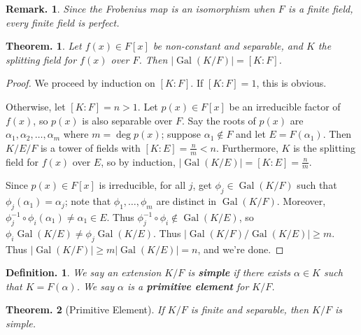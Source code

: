 \documentclass[11pt, a4paper]{memoir}
\newcommand{\mbf}[1]{{\boldmath\bfseries #1}}
\theoremstyle{change}
\newtheorem{theorem}{Theorem.}[section]
\theoremstyle{plain}
\theoremstyle{nonumberplain}
\newtheorem{definition}{Definition.}
\newtheorem{remark}{Remark.}
\newtheorem{proof}{Proof}
\DeclareMathOperator{\Gal}{Gal}
\numberwithin{equation}{section}
\begin{document}
\begin{remark}
    Since the Frobenius map is an isomorphism when $F$ is a finite field, every finite field is perfect.
\end{remark}
\begin{theorem}\label{thm:gal-size}
    Let $f(x)\in F[x]$ be non-constant and separable, and $K$ the splitting field for $f(x)$ over $F$.
    Then $|\Gal(K/F)|=[K:F]$.
\end{theorem}
\begin{proof}
    We proceed by induction on $[K:F]$.
    If $[K:F]=1$, this is obvious.

    Otherwise, let $[K:F]=n>1$.
    Let $p(x)\in F[x]$ be an irreducible factor of $f(x)$, so $p(x)$ is also separable over $F$.
    Say the roots of $p(x)$ are $\alpha_1,\alpha_2,\ldots,\alpha_m$ where $m=\deg p(x)$; suppose $\alpha_1\notin F$ and let $E=F(\alpha_1)$.
    Then $K/E/F$ is a tower of fields with $[K:E]=\frac{n}{m}<n$.
    Furthermore, $K$ is the splitting field for $f(x)$ over $E$, so by induction, $|\Gal(K/E)|=[K:E]=\frac{n}{m}$.

    Since $p(x)\in F[x]$ is irreducible, for all $j$, get $\phi_j\in\Gal(K/F)$ such that $\phi_j(\alpha_1)=\alpha_j$; note that $\phi_1,\ldots,\phi_m$ are distinct in $\Gal(K/F)$.
    Moreover, $\phi_j^{-1}\circ\phi_i(\alpha_1)\neq\alpha_1\in E$.
    Thus $\phi_j^{-1}\circ\phi_i\notin\Gal(K/E)$, so $\phi_i\Gal(K/E)\neq \phi_j\Gal(K/E)$.
    Thus $|\Gal(K/F)/\Gal(K/E)|\geq m$.
    Thus $|\Gal(K/F)|\geq m|\Gal(K/E)|=n$, and we're done.
\end{proof}
\begin{definition}
    We say an extension $K/F$ is \mbf{simple} if there exists $\alpha\in K$ such that $K=F(\alpha)$.
    We say $\alpha$ is a \mbf{primitive element} for $K/F$.
\end{definition}
\begin{theorem}[Primitive Element]
    If $K/F$ is finite and separable, then $K/F$ is simple.
\end{theorem}
\end{document}
